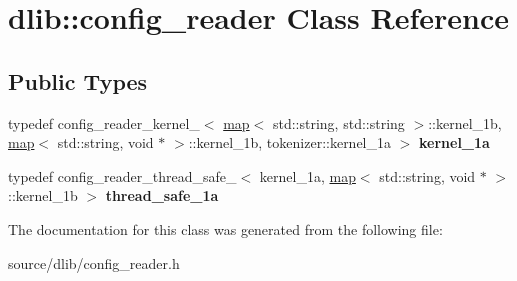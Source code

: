 \hypertarget{classdlib_1_1config__reader}{
\section{dlib::config\_\-reader Class Reference}
\label{classdlib_1_1config__reader}
}
\subsection*{Public Types}
\begin{DoxyCompactItemize}
\item 
\hypertarget{classdlib_1_1config__reader_a98434e74d8584f650cfc382922bbbb08}{
typedef config\_\-reader\_\-kernel\_$<$ \hyperlink{classdlib_1_1map}{map}$<$ std::string, std::string $>$::kernel\_\-1b, \hyperlink{classdlib_1_1map}{map}$<$ std::string, void $\ast$ $>$::kernel\_\-1b, tokenizer::kernel\_\-1a $>$ {\bfseries kernel\_\-1a}}
\label{classdlib_1_1config__reader_a98434e74d8584f650cfc382922bbbb08}

\item 
\hypertarget{classdlib_1_1config__reader_a202da19d39f9c6b1799796849637458f}{
typedef config\_\-reader\_\-thread\_\-safe\_$<$ kernel\_\-1a, \hyperlink{classdlib_1_1map}{map}$<$ std::string, void $\ast$ $>$::kernel\_\-1b $>$ {\bfseries thread\_\-safe\_\-1a}}
\label{classdlib_1_1config__reader_a202da19d39f9c6b1799796849637458f}

\end{DoxyCompactItemize}


The documentation for this class was generated from the following file:\begin{DoxyCompactItemize}
\item 
source/dlib/config\_\-reader.h\end{DoxyCompactItemize}
